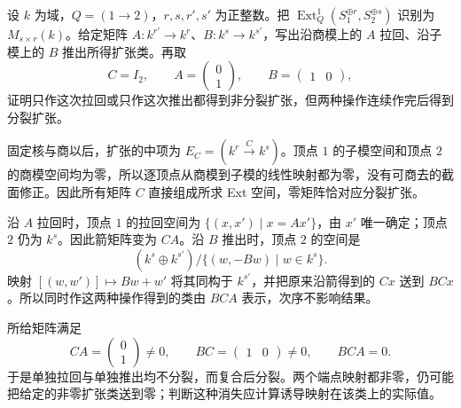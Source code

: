\begin{optionalexercise}\label{b5:ex:09-extension-endpoint-maps}
	设 \(k\) 为域，\(Q=(1\to2)\)，\(r,s,r',s'\) 为正整数。把 \(\operatorname{Ext}^1_Q(S_1^{\oplus r},S_2^{\oplus s})\) 识别为 \(M_{s\times r}(k)\)。给定矩阵 \(A:k^{r'}\to k^r\)、\(B:k^s\to k^{s'}\)，写出沿商模上的 \(A\) 拉回、沿子模上的 \(B\) 推出所得扩张类。再取
	\[
		C=I_2,\qquad A=\begin{pmatrix}0\\1\end{pmatrix},\qquad B=\begin{pmatrix}1&0\end{pmatrix},
	\]
	证明只作这次拉回或只作这次推出都得到非分裂扩张，但两种操作连续作完后得到分裂扩张。
\end{optionalexercise}
\begin{solution}
	固定核与商以后，扩张的中项为 \(E_C=(k^r\xrightarrow{C}k^s)\)。顶点 \(1\) 的子模空间和顶点 \(2\) 的商模空间均为零，所以逐顶点从商模到子模的线性映射都为零，没有可商去的截面修正。因此所有矩阵 \(C\) 直接组成所求 Ext 空间，零矩阵恰对应分裂扩张。

	沿 \(A\) 拉回时，顶点 \(1\) 的拉回空间为 \(\{(x,x')\mid x=Ax'\}\)，由 \(x'\) 唯一确定；顶点 \(2\) 仍为 \(k^s\)。因此箭矩阵变为 \(CA\)。沿 \(B\) 推出时，顶点 \(2\) 的空间是
	\[
		(k^s\oplus k^{s'})/\{(w,-Bw)\mid w\in k^s\}.
	\]
	映射 \([(w,w')]\mapsto Bw+w'\) 将其同构于 \(k^{s'}\)，并把原来沿箭得到的 \(Cx\) 送到 \(BCx\)。所以同时作这两种操作得到的类由 \(BCA\) 表示，次序不影响结果。

	所给矩阵满足
	\[
		CA=\begin{pmatrix}0\\1\end{pmatrix}\ne0,\qquad BC=\begin{pmatrix}1&0\end{pmatrix}\ne0,\qquad BCA=0.
	\]
	于是单独拉回与单独推出均不分裂，而复合后分裂。两个端点映射都非零，仍可能把给定的非零扩张类送到零；判断这种消失应计算诱导映射在该类上的实际值。
\end{solution}

